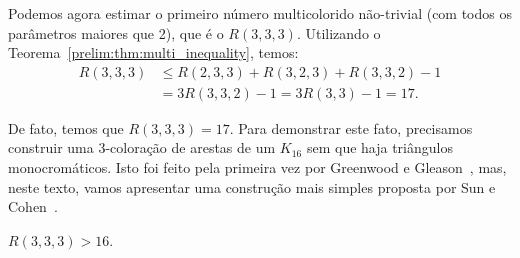 Podemos agora estimar o primeiro número multicolorido não-trivial (com todos os parâmetros maiores que 2), que é o $R(3,3,3)$. Utilizando o Teorema~\ref{prelim:thm:multi_inequality}, temos:
\begin{align*}
R(3,3,3) &\leq R(2,3,3) + R(3,2,3) + R(3,3,2) - 1 \\
&= 3R(3,3,2) - 1 = 3R(3,3) -1 = 17.
\end{align*}

De fato, temos que $R(3,3,3) = 17$. Para demonstrar este fato, precisamos construir uma 3-coloração de arestas de um $K_{16}$ sem que haja triângulos monocromáticos. Isto foi feito pela primeira vez por Greenwood e Gleason~\cite{greenwood}, mas, neste texto, vamos apresentar uma construção mais simples proposta por Sun e Cohen~\cite{sun}.

\begin{proposition}
\label{prelim:thm:exr333}
$R(3,3,3) > 16$.
\end{proposition}
